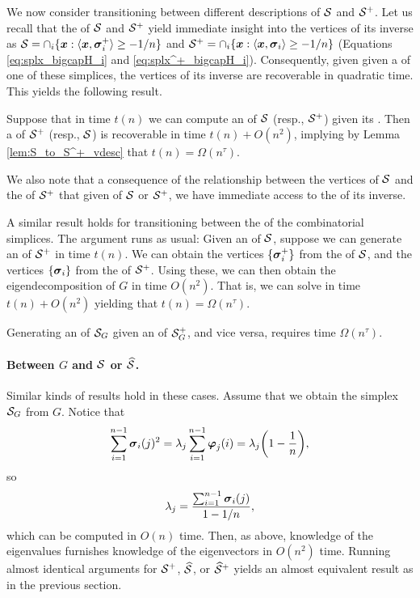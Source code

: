  We now consider transitioning between different descriptions of $\mathcal{S}$ and $\mathcal{S}^+$. Let us recall that the \hdesc of $\mathcal{S}$ and $\mathcal{S}^+$ yield immediate insight into the vertices of its inverse as $\mathcal{S}=\cap_i \{\vb*{x}:\langle \vb*{x},\vb*{\sigma}_i^+\rangle \geq -1/n\}$ and $\mathcal{S}^+=\cap_i\{\vb*{x}:\langle\vb*{x},\vb*{\sigma}_i\rangle \geq -1/n\}$ (Equations \eqref{eq:splx_bigcapH_i} and \eqref{eq:splx^+_bigcapH_i}). Consequently, given given a \hdesc of one of these simplices, the vertices of its inverse are recoverable in quadratic time. This yields the following result. 
 
 \begin{lemma}
 	\label{lem:S_vdesc_to_hdesc}
	 Suppose that in time $t(n)$ we can compute an \hdesc of $\mathcal{S}$ (resp., $\mathcal{S}^+$) given its \vdesc. Then a \vdesc of $\mathcal{S}^+$ (resp., $\mathcal{S}$) is recoverable in time $t(n) + O(n^2)$, implying by Lemma \ref{lem:S_to_S^+_vdesc} that $t(n) = \Omega(n^\tau)$. 
 \end{lemma}

We also note that a consequence of the relationship between the vertices of $\mathcal{S}$ and the \hdesc of $\mathcal{S}^+$ that given \vdesc of $\mathcal{S}$ or $\mathcal{S}^+$, we have immediate access to the \hdesc of its inverse. 

A similar result holds for transitioning between the \hdesc of the combinatorial simplices. The argument runs as usual: Given an \hdesc of $\mathcal{S}$, suppose we can generate an \hdesc of $\mathcal{S}^+$ in time $t(n)$. We can obtain the vertices $\{\vb*{\sigma}_i^+\}$ from the \hdesc of $\mathcal{S}$, and the vertices $\{\vb*{\sigma}_i\}$ from the \hdesc of $\mathcal{S}^+$. Using these, we can then obtain the eigendecomposition of $G$ in time $O(n^2)$. That is, we can solve \lapdecomp in time $t(n) + O(n^2)$ yielding that $t(n) = \Omega(n^\tau)$. 

\begin{lemma}
	\label{lem:hdesc_to_hdesc}
	Generating an \hdesc of $\mathcal{S}_G$ given an \hdesc of $\mathcal{S}_G^+$, and vice versa, requires time $\Omega(n^\tau)$. 
\end{lemma}


\paragraph{Between \texorpdfstring{$G$}{the graph} and \texorpdfstring{$\mathcal{S}$ or $\widehat{\mathcal{S}}$}{its simplices}.}
Similar kinds of results hold  in these cases. Assume that we obtain  the simplex $\mathcal{S}_G$ from $G$. Notice  that \[\sum_{i=1}^{n-1}   \vb*{\sigma}_i(j)^2 = \lambda_j \sum_{i=1}^{n-1} \vb*{\varphi}_j(i) = \lambda_j\bigg(1-\frac{1}{n}\bigg),\]
so 
\[\lambda_j = \frac{\sum_{i=1}^{n-1}\vb*{\sigma}_i(j)}{1-1/n},\]
which can be computed  in $O(n)$  time. Then, as above, knowledge of the eigenvalues furnishes knowledge  of the eigenvectors in $O(n^2)$ time. Running almost identical arguments for $\mathcal{S}^+$, $\widehat{\mathcal{S}}$, or $\widehat{\mathcal{S}}^+$ yields an almost equivalent result as in the previous section.  

